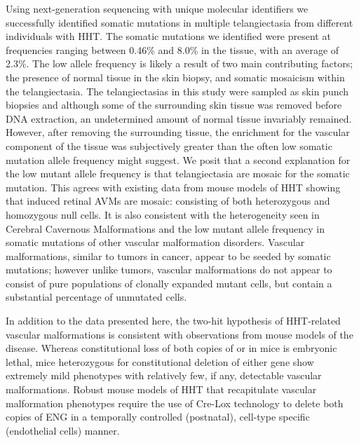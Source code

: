 Using next-generation sequencing with unique molecular identifiers we successfully identified somatic mutations in multiple telangiectasia from different individuals with HHT.  The somatic mutations we identified were present at frequencies ranging between 0.46\% and 8.0\% in the tissue, with an average of 2.3\%. The low allele frequency is likely a result of two main contributing factors; the presence of normal tissue in the skin biopsy, and somatic mosaicism within the telangiectasia. The telangiectasias in this study were sampled as skin punch biopsies and although some of the surrounding skin tissue was removed before DNA extraction, an undetermined amount of normal tissue invariably remained.  However, after removing the surrounding tissue, the enrichment for the vascular component of the tissue was subjectively greater than the often low somatic mutation allele frequency might suggest. We posit that a second explanation for the low mutant allele frequency is that telangiectasia are mosaic for the somatic mutation. This agrees with existing data from mouse models of HHT showing that induced retinal AVMs are mosaic: consisting of both heterozygous and homozygous null cells.\citep{jin2017} It is also consistent with the heterogeneity seen in Cerebral Cavernous Malformations\citep{detter2018, malinverno2019} and the low mutant allele frequency in somatic mutations of other vascular malformation disorders.\citep{alolabi2018, soblet2017, limaye2015, limaye2009, shirley2013, couto2015, luks2015, nikolaev2018, couto2017, akers2009, mcdonald2014}  Vascular malformations, similar to tumors in cancer, appear to be seeded by somatic mutations; however unlike tumors, vascular malformations do not appear to consist of pure populations of clonally expanded mutant cells, but contain a substantial percentage of unmutated cells.   	

	In addition to the data presented here, the two-hit hypothesis of HHT-related vascular malformations is consistent with observations from mouse models of the disease. Whereas constitutional loss of both copies of  or  in mice is embryonic lethal, mice heterozygous for constitutional deletion of either gene show extremely mild phenotypes with relatively few, if any, detectable vascular malformations.\citep{bourdeau1999, srinivasan2003} Robust mouse models of HHT that recapitulate vascular malformation phenotypes require the use of Cre-Lox technology to delete both copies of ENG in a temporally controlled (postnatal), cell-type specific (endothelial cells) manner. 
	
